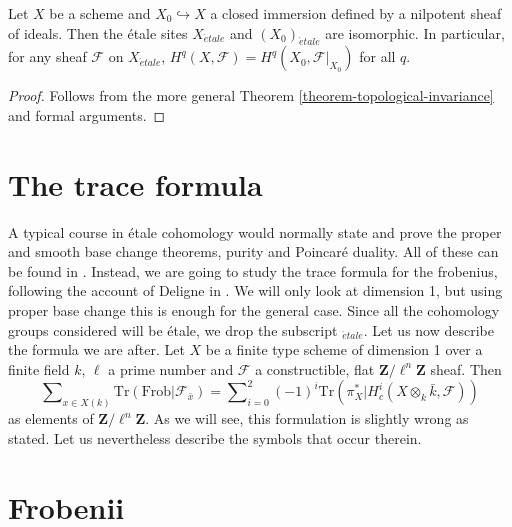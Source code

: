 \begin{proposition}
\label{proposition-topological-invariance}
Let $X$ be a scheme and $X_0\hookrightarrow X$ a closed immersion defined by a
nilpotent sheaf of ideals. Then the \'etale sites $X_{\acute{e}tale}$ and
$(X_0)_{\acute{e}tale}$ are
isomorphic. In particular, for any sheaf $\mathcal{F}$ on
$X_{\acute{e}tale}$, $H^q(X,
\mathcal{F}) = H^q(X_0, \mathcal{F}|_{X_0})$ for all $q$.
\end{proposition}

\begin{proof}
Follows from the more general
Theorem \ref{theorem-topological-invariance}
and formal arguments.
\end{proof}




\section{The trace formula}
\label{section-trace-formula}

\noindent
A typical course in \'etale cohomology would normally state and prove the
proper and smooth base change theorems, purity and Poincar\'e duality. All of
these can be found in \cite[Arcata]{SGA4.5}. Instead, we are going to study the
trace formula for the frobenius, following the account of Deligne in
\cite[Rapport]{SGA4.5}. We will only look at dimension 1, but using proper base
change this is enough for the general case. Since all the cohomology groups
considered will be \'etale, we drop the subscript $_{\acute{e}tale}$. Let us
now describe
the formula we are after. Let $X$ be a finite type scheme of dimension 1 over a
finite field $k$, $\ell$ a prime number and $\mathcal{F}$ a constructible, flat
$\mathbf{Z}/\ell^n\mathbf{Z}$ sheaf. Then
\begin{equation}
\label{equation-trace-formula-initial}
\sum\nolimits_{x \in X(k)}
\text{Tr}(\text{Frob} | \mathcal{F}_{\bar x}) =
\sum\nolimits_{i=0}^2
(-1)^i \text{Tr}(\pi_X^* | H^i_c(X \otimes_k \bar k, \mathcal{F}))
\end{equation}
as elements of $\mathbf{Z}/\ell^n\mathbf{Z}$. As we will see, this formulation
is slightly wrong as stated. Let us nevertheless describe the symbols that
occur therein.




\section{Frobenii}
\label{section-frobenii}

